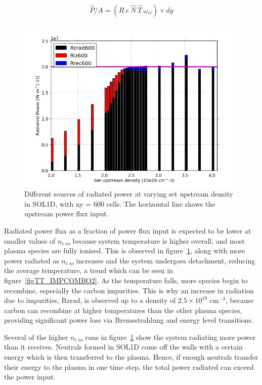 \documentclass[12pt]{article}  %
\providecommand{\noNe}[1]{{${#1}\times 10^{19}$ cm$^{-3}$}} %
\providecommand{\neus}{$n_{e~us}~$} %
\begin{document}
\begin{equation}\label{eqRpflux}
\hat{P}/A = (R~e~\hat{N}~\hat{T}~\omega_{ci}) \times dy
\end{equation}

\begin{figure}
\includegraphics[scale=0.5]{Figures/sol1d/PRbar600.png}
\centering
\caption{Different sources of radiated power at varying set upstream density in SOL1D, with ny = 600 cells. The horizontal line shows the upstream power flux input.}\label{figPRbar600}
\end{figure}

Radiated power flux as a fraction of power flux input is expected to be lower at smaller values of \neus because system temperature is higher overall, and most plasma species are fully ionised. This is observed in figure~\ref{figPRbar600}, along with more power radiated as \neus increases and the system undergoes detachment, reducing the average temperature, a trend which can be seen in figure~\ref{figTT_IMPCOMBO2}. As the temperature falls, more species begin to recombine, especially the carbon impurities. This is why an increase in radiation due to impurities, Rzrad, is observed up to a density of \noNe{2.5}, because carbon can recombine at higher temperatures than the other plasma species, providing significant power loss via Bremsstrahlung and energy level transitions.

Several of the higher \neus runs in figure~\ref{figPRbar600} show the system radiating more power than it receives. Neutrals formed in SOL1D come off the walls with a certain energy which is then transferred to the plasma. Hence, if enough neutrals transfer their energy to the plasma in one time step, the total power radiated can exceed the power input.
\end{document}

